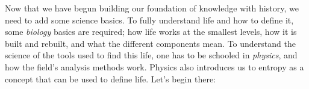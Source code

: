 Now that we have begun building our foundation of knowledge with history, we need to add some science basics. To fully understand life and how to define it, some \emph{biology} basics are required; how life works at the smallest levels, how it is built and rebuilt, and what the different components mean. To understand the science of the tools used to find this life, one has to be schooled in \emph{physics}, and how the field's analysis methods work. Physics also introduces us to entropy as a concept that can be used to define life. Let's begin there: